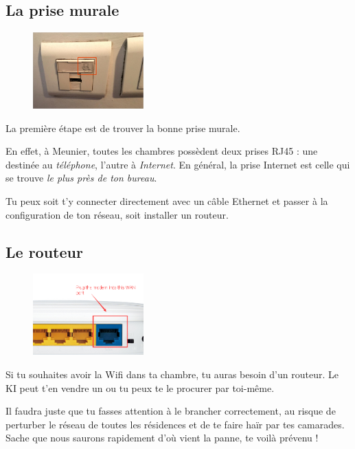 \documentclass{ki019}
\begin{document}
  \newpage
    \Header{}


    \tableofcontents

  \newpage

    \subsection{La prise murale}
    \begin{figure}
      \centering
      \includegraphics[width=0.38\textwidth]{page6}
    \end{figure}
    La première étape est de trouver la bonne prise murale.

    En effet, à Meunier, toutes les chambres possèdent deux prises RJ45 : une destinée au \emph{téléphone}, l'autre à \emph{Internet}. En général, la prise Internet est celle qui se trouve \emph{le plus près de ton bureau}.

    Tu peux soit t’y connecter directement avec un câble Ethernet et passer à la configuration de ton réseau, soit installer un routeur. %


\bigskip
    \subsection{Le routeur}
    \begin{figure}
      \centering
      \includegraphics[width=0.38\textwidth]{page7}
    \end{figure}
    Si tu souhaites avoir la Wifi dans ta chambre, tu auras besoin d’un routeur. Le KI peut t'en vendre un ou tu peux te le procurer par toi-même.


    Il faudra juste que tu fasses attention à le brancher correctement, au risque de perturber le réseau de toutes les résidences et de te faire haïr par tes camarades. Sache que nous saurons rapidement d’où vient la panne, te voilà prévenu !
\end{document}
